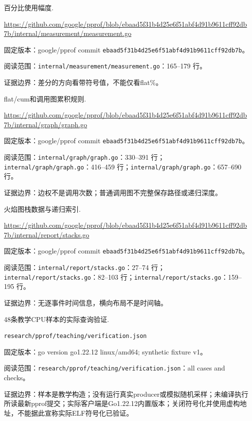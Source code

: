 \documentclass[UTF8,fontset=fandol,openany,11pt]{ctexbook}
\begin{document}
\begin{thebibliography}{999}
 百分比使用幅度.\par
\url{https://github.com/google/pprof/blob/ebaad5f31b4d25e6f51abf4d91b9611cff92db7b/internal/measurement/measurement.go}\par
{\small\raggedright 固定版本：google/pprof commit \texttt{ebaad5f3\allowbreak{}1b4d25e6\allowbreak{}f51abf4d\allowbreak{}91b9611c\allowbreak{}ff92db7b}。\par
阅读范围：\nolinkurl{internal/measurement/measurement.go}：165–179 行。\par
证据边界：差分的方向看带符号值，不能仅看flat\%。
}

 flat/cum和调用图累积规则.\par
\url{https://github.com/google/pprof/blob/ebaad5f31b4d25e6f51abf4d91b9611cff92db7b/internal/graph/graph.go}\par
{\small\raggedright 固定版本：google/pprof commit \texttt{ebaad5f3\allowbreak{}1b4d25e6\allowbreak{}f51abf4d\allowbreak{}91b9611c\allowbreak{}ff92db7b}。\par
阅读范围：\nolinkurl{internal/graph/graph.go}：330–391 行；\nolinkurl{internal/graph/graph.go}：416–459 行；\nolinkurl{internal/graph/graph.go}：657–690 行。\par
证据边界：边权不是调用次数；普通调用图不完整保存路径或递归深度。
}

 火焰图栈数据与递归索引.\par
\url{https://github.com/google/pprof/blob/ebaad5f31b4d25e6f51abf4d91b9611cff92db7b/internal/report/stacks.go}\par
{\small\raggedright 固定版本：google/pprof commit \texttt{ebaad5f3\allowbreak{}1b4d25e6\allowbreak{}f51abf4d\allowbreak{}91b9611c\allowbreak{}ff92db7b}。\par
阅读范围：\nolinkurl{internal/report/stacks.go}：27–74 行；\nolinkurl{internal/report/stacks.go}：82–103 行；\nolinkurl{internal/report/stacks.go}：159–195 行。\par
证据边界：无逐事件时间信息，横向布局不是时间轴。
}

 48条教学CPU样本的实际查询验证.\par
\nolinkurl{research/pprof/teaching/verification.json}\par
{\small\raggedright 固定版本：go version go1.22.12 linux/amd64; synthetic fixture v1。\par
阅读范围：\nolinkurl{research/pprof/teaching/verification.json}：all cases and checks。\par
证据边界：样本是教学构造；没有运行真实producer或模拟随机采样；未编译执行所读最新pprof提交；实际客户端是Go1.22.12内置版本；关闭符号化并使用虚构地址，不能据此宣称实际ELF符号化已验证。
}


\end{thebibliography}
\end{document}
